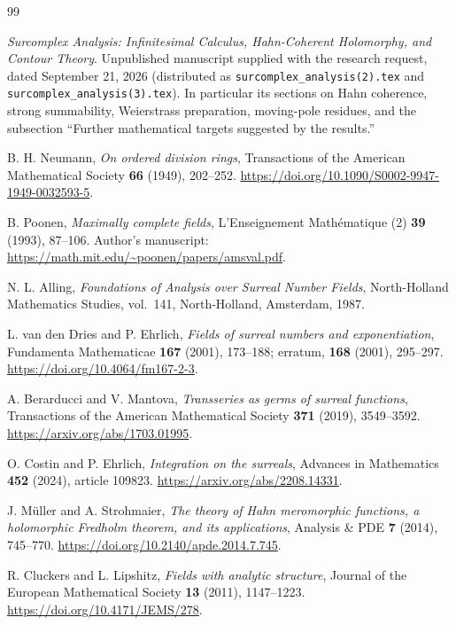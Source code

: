 \documentclass[11pt,letterpaper]{article}
\theoremstyle{definition}
\theoremstyle{remark}
\numberwithin{equation}{section}
\begin{document}
\begingroup
\small
\setlength{\parskip}{0pt}
\begin{thebibliography}{99}
\setlength{\itemsep}{0.4em}

\emph{Surcomplex Analysis: Infinitesimal Calculus, Hahn-Coherent Holomorphy, and Contour Theory}.
Unpublished manuscript supplied with the research request, dated September 21, 2026
(distributed as \texttt{surcomplex\_analysis(2).tex} and \texttt{surcomplex\_analysis(3).tex}).
In particular its sections on Hahn coherence, strong summability, Weierstrass preparation,
moving-pole residues, and the subsection ``Further mathematical targets suggested by the results.''

B. H. Neumann, \emph{On ordered division rings},
Transactions of the American Mathematical Society \textbf{66} (1949), 202--252.
\url{https://doi.org/10.1090/S0002-9947-1949-0032593-5}.

B. Poonen, \emph{Maximally complete fields},
L'Enseignement Math\'ematique (2) \textbf{39} (1993), 87--106.
Author's manuscript: \url{https://math.mit.edu/~poonen/papers/amsval.pdf}.

N. L. Alling, \emph{Foundations of Analysis over Surreal Number Fields},
North-Holland Mathematics Studies, vol.~141, North-Holland, Amsterdam, 1987.

L. van den Dries and P. Ehrlich, \emph{Fields of surreal numbers and exponentiation},
Fundamenta Mathematicae \textbf{167} (2001), 173--188;
erratum, \textbf{168} (2001), 295--297.
\url{https://doi.org/10.4064/fm167-2-3}.

A. Berarducci and V. Mantova,
\emph{Transseries as germs of surreal functions},
Transactions of the American Mathematical Society \textbf{371} (2019), 3549--3592.
\url{https://arxiv.org/abs/1703.01995}.

O. Costin and P. Ehrlich, \emph{Integration on the surreals},
Advances in Mathematics \textbf{452} (2024), article 109823.
\url{https://arxiv.org/abs/2208.14331}.

J. M\"uller and A. Strohmaier,
\emph{The theory of Hahn meromorphic functions, a holomorphic Fredholm theorem, and its applications},
Analysis \& PDE \textbf{7} (2014), 745--770.
\url{https://doi.org/10.2140/apde.2014.7.745}.

R. Cluckers and L. Lipshitz, \emph{Fields with analytic structure},
Journal of the European Mathematical Society \textbf{13} (2011), 1147--1223.
\url{https://doi.org/10.4171/JEMS/278}.


\end{thebibliography}
\end{document}
